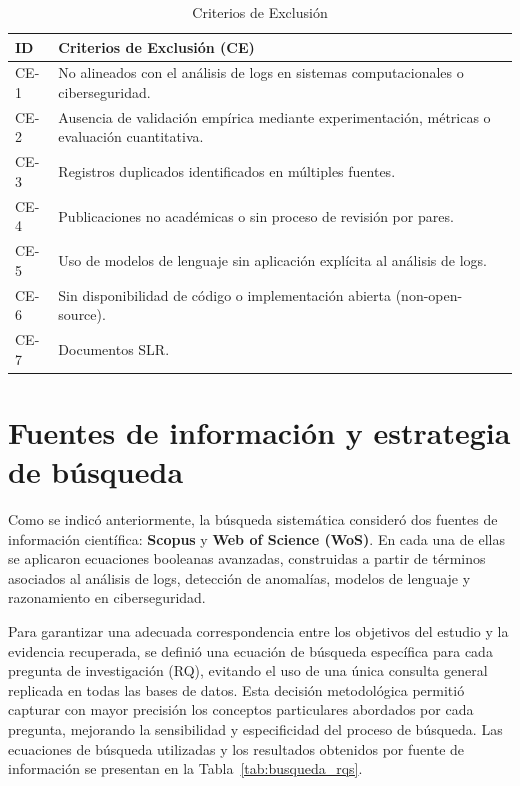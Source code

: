 \begin{table}[H]
\centering
\renewcommand{\arraystretch}{1.2}
\caption{Criterios de Exclusión}
\renewcommand{\tablename}{Table}
\setlength{\arrayrulewidth}{1pt}
\begin{tabularx}{0.9\textwidth}{@{} l X @{}}
\toprule
\hline
\textbf{ID} & \textbf{Criterios de Exclusión (CE)} \\
\hline
\midrule
CE-1   & No alineados con el análisis de logs en sistemas computacionales o ciberseguridad. \\
CE-2   & Ausencia de validación empírica mediante experimentación, métricas o evaluación cuantitativa. \\
CE-3   & Registros duplicados identificados en múltiples fuentes. \\
CE-4   & Publicaciones no académicas o sin proceso de revisión por pares. \\
CE-5   & Uso de modelos de lenguaje sin aplicación explícita al análisis de logs.\\
CE-6   & Sin disponibilidad de código o implementación abierta (non-open-source).\\
CE-7   & Documentos SLR.\\
\bottomrule
\hline
\end{tabularx}
\end{table}

\section{Fuentes de información y estrategia de búsqueda}

Como se indicó anteriormente, la búsqueda sistemática consideró dos fuentes de información científica: \textbf{Scopus} y \textbf{Web of Science (WoS)}. En cada una de ellas se aplicaron ecuaciones booleanas avanzadas, construidas a partir de términos asociados al análisis de logs, detección de anomalías, modelos de lenguaje y razonamiento en ciberseguridad.

Para garantizar una adecuada correspondencia entre los objetivos del estudio y la evidencia recuperada, se definió una ecuación de búsqueda específica para cada pregunta de investigación (RQ), evitando el uso de una única consulta general replicada en todas las bases de datos. Esta decisión metodológica permitió capturar con mayor precisión los conceptos particulares abordados por cada pregunta, mejorando la sensibilidad y especificidad del proceso de búsqueda. Las ecuaciones de búsqueda utilizadas y los resultados obtenidos por fuente de información se presentan en la Tabla~\ref{tab:busqueda_rqs}.


